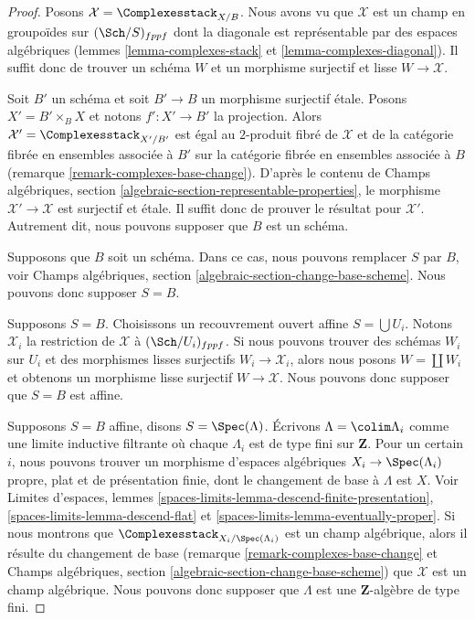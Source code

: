 \begin{proof}
Posons $\mathcal{X} = \Complexesstack_{X/B}$. Nous avons vu que $\mathcal{X}$
est un champ en groupoïdes sur $(\Sch/S)_{fppf}$ dont la diagonale est
représentable par des espaces algébriques
(lemmes \ref{lemma-complexes-stack} et \ref{lemma-complexes-diagonal}).
Il suffit donc de trouver un schéma $W$ et un morphisme surjectif et lisse
$W \to \mathcal{X}$.

\medskip\noindent
Soit $B'$ un schéma et soit $B' \to B$ un morphisme surjectif \'etale.
Posons $X' = B' \times_B X$ et notons $f' : X' \to B'$ la projection.
Alors $\mathcal{X}' = \Complexesstack_{X'/B'}$ est égal au $2$-produit fibré
de $\mathcal{X}$ et de la catégorie fibrée en ensembles associée à $B'$ sur la
catégorie fibrée en ensembles associée à $B$
(remarque \ref{remark-complexes-base-change}). D'après le contenu de
Champs algébriques, section
\ref{algebraic-section-representable-properties}, le morphisme
$\mathcal{X}' \to \mathcal{X}$ est surjectif et \'etale.
Il suffit donc de prouver le résultat pour $\mathcal{X}'$.
Autrement dit, nous pouvons supposer que $B$ est un schéma.

\medskip\noindent
Supposons que $B$ soit un schéma. Dans ce cas, nous pouvons remplacer $S$ par
$B$, voir Champs algébriques, section
\ref{algebraic-section-change-base-scheme}.
Nous pouvons donc supposer $S = B$.

\medskip\noindent
Supposons $S = B$. Choisissons un recouvrement ouvert affine
$S = \bigcup U_i$. Notons $\mathcal{X}_i$ la restriction de $\mathcal{X}$ à
$(\Sch/U_i)_{fppf}$. Si nous pouvons trouver des schémas $W_i$ sur $U_i$ et
des morphismes lisses surjectifs $W_i \to \mathcal{X}_i$, alors nous posons
$W = \coprod W_i$ et obtenons un morphisme lisse surjectif
$W \to \mathcal{X}$. Nous pouvons donc supposer que $S = B$ est affine.

\medskip\noindent
Supposons $S = B$ affine, disons $S = \Spec(\Lambda)$.
Écrivons $\Lambda = \colim \Lambda_i$ comme une limite inductive filtrante où
chaque $\Lambda_i$ est de type fini sur $\mathbf{Z}$. Pour un certain $i$,
nous pouvons trouver un morphisme d'espaces algébriques
$X_i \to \Spec(\Lambda_i)$ propre, plat et de présentation finie, dont le
changement de base à $\Lambda$ est $X$. Voir Limites d'espaces, lemmes
\ref{spaces-limits-lemma-descend-finite-presentation},
\ref{spaces-limits-lemma-descend-flat} et
\ref{spaces-limits-lemma-eventually-proper}.
Si nous montrons que $\Complexesstack_{X_i/\Spec(\Lambda_i)}$ est un champ
algébrique, alors il résulte du changement de base
(remarque \ref{remark-complexes-base-change} et
Champs algébriques, section \ref{algebraic-section-change-base-scheme})
que $\mathcal{X}$ est un champ algébrique.
Nous pouvons donc supposer que $\Lambda$ est une $\mathbf{Z}$-algèbre de type
fini.


\end{proof}
